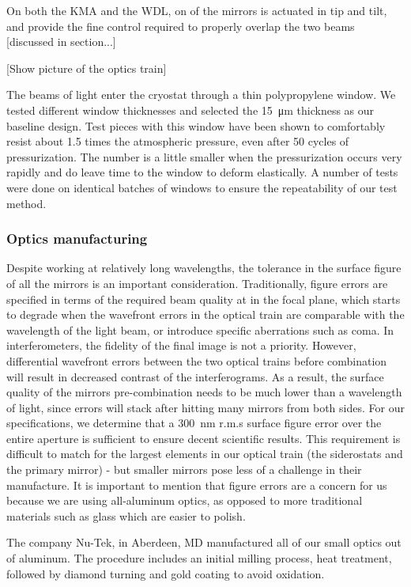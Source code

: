 On both the KMA and the WDL, on of the mirrors is actuated in tip and tilt, and provide the fine control required to properly overlap the two beams [discussed in section...]

[Show picture of the optics train]

The beams of light enter the cryostat through a thin polypropylene window. We tested different window thicknesses and selected the \SI{15}{\micro\meter} thickness as our baseline design. Test pieces with this window have been shown to comfortably resist about 1.5 times the atmospheric pressure, even after 50 cycles of pressurization. The number is a little smaller when the pressurization occurs very rapidly and do leave time to the window to deform elastically. A number of tests were done on identical batches of windows to ensure the repeatability of our test method. 




\subsubsection{Optics manufacturing}

Despite working at relatively long wavelengths, the tolerance in the surface figure of all the mirrors is an important consideration. Traditionally, figure errors are specified in terms of the required beam quality at in the focal plane, which starts to degrade when the wavefront errors in the optical train are comparable with the wavelength of the light beam, or introduce specific aberrations such as coma. In interferometers, the fidelity of the final image is not a priority. However, differential wavefront errors between the two optical trains before combination will result in decreased contrast of the interferograms. As a result, the surface quality of the mirrors pre-combination needs to be much lower than a wavelength of light, since errors will stack after hitting many mirrors from both sides. For our specifications, we determine that a \SI{300}{\nano\meter} r.m.s surface figure error over the entire aperture is sufficient to ensure decent scientific results. This requirement is difficult to match for the largest elements in our optical train (the siderostats and the primary mirror) - but smaller mirrors pose less of a challenge in their manufacture. It is important to mention that figure errors are a concern for us because we are using all-aluminum optics, as opposed to more traditional materials such as glass which are easier to polish.

The company Nu-Tek, in Aberdeen, MD manufactured all of our small optics out of aluminum. The procedure includes an initial milling process, heat treatment, followed by diamond turning and gold coating to avoid oxidation.

